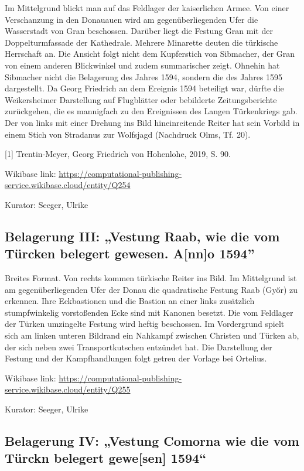 \documentclass[
  11pt,
  a4paper,
  openany]{book}
\begin{document}
Im Mittelgrund blickt man auf das Feldlager der kaiserlichen Armee. Von
einer Verschanzung in den Donauauen wird am gegenüberliegenden Ufer die
Wasserstadt von Gran beschossen. Darüber liegt die Festung Gran mit der
Doppelturmfassade der Kathedrale. Mehrere Minarette deuten die türkische
Herrschaft an. Die Ansicht folgt nicht dem Kupferstich von Sibmacher,
der Gran von einem anderen Blickwinkel und zudem summarischer zeigt.
Ohnehin hat Sibmacher nicht die Belagerung des Jahres 1594, sondern die
des Jahres 1595 dargestellt. Da Georg Friedrich an dem Ereignis 1594
beteiligt war, dürfte die Weikersheimer Darstellung auf Flugblätter oder
bebilderte Zeitungsberichte zurückgehen, die es mannigfach zu den
Ereignissen des Langen Türkenkriegs gab. Der von links mit einer Drehung
ins Bild hineinreitende Reiter hat sein Vorbild in einem Stich von
Stradanus zur Wolfsjagd (Nachdruck Olms, Tf. 20).

{[}1{]} Trentin-Meyer, Georg Friedrich von Hohenlohe, 2019, S. 90.

Wikibase link:
\url{https://computational-publishing-service.wikibase.cloud/entity/Q254}

Kurator: Seeger, Ulrike

\subsection{Belagerung III: „Vestung Raab, wie die vom Türcken belegert
gewesen. A{[}nn{]}o
1594''}\label{belagerung-iii-vestung-raab-wie-die-vom-tuxfcrcken-belegert-gewesen.-anno-1594}

Breites Format. Von rechts kommen türkische Reiter ins Bild. Im
Mittelgrund ist am gegenüberliegenden Ufer der Donau die quadratische
Festung Raab (Győr) zu erkennen. Ihre Eckbastionen und die Bastion an
einer links zusätzlich stumpfwinkelig vorstoßenden Ecke sind mit Kanonen
besetzt. Die vom Feldlager der Türken umzingelte Festung wird heftig
beschossen. Im Vordergrund spielt sich am linken unteren Bildrand ein
Nahkampf zwischen Christen und Türken ab, der sich neben zwei
Transportkutschen entzündet hat. Die Darstellung der Festung und der
Kampfhandlungen folgt getreu der Vorlage bei Ortelius.

Wikibase link:
\url{https://computational-publishing-service.wikibase.cloud/entity/Q255}

Kurator: Seeger, Ulrike

\subsection{Belagerung IV: „Vestung Comorna wie die vom Türckn belegert
gewe{[}sen{]}
1594``}\label{belagerung-iv-vestung-comorna-wie-die-vom-tuxfcrckn-belegert-gewesen-1594}
\end{document}
